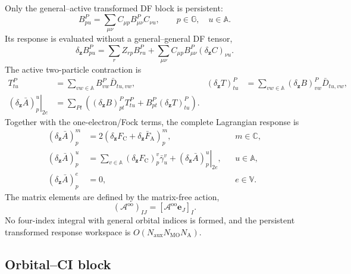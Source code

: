 \documentclass[aip,preprint,nofootinbib]{revtex4-1}
\newcommand{\core}{\mathrm{C}}
\newcommand{\act}{\mathrm{A}}
\begin{document}
Only the general--active transformed DF block is persistent:
\begin{equation}
 B^P_{pu}=\sum_{\mu\nu}C_{\mu p}B^P_{\mu\nu}C_{\nu u},
 \qquad p\in\mathbb G,\quad u\in\mathbb A.
 \label{eq:nr-general-active-df}
\end{equation}
Its response is evaluated without a general--general DF tensor,
\begin{equation}
 \delta_{\mathbf z}B^P_{pu}
 =\sum_rZ_{rp}B^P_{ru}
 +\sum_{\mu\nu}C_{\mu p}B^P_{\mu\nu}
 (\delta_{\mathbf z}C)_{\nu u}.
 \label{eq:nr-general-active-df-response}
\end{equation}
The active two-particle contraction is
\begin{align}
 T^P_{tu}&=\sum_{vw\in\mathbb A}B^P_{vw}\bar D_{tu,vw},
 &(\delta_{\mathbf z}T)^P_{tu}
 &=\sum_{vw\in\mathbb A}(\delta_{\mathbf z}B)^P_{vw}\bar D_{tu,vw},
 \label{eq:nr-df-working-rdm}
 \\
 \left.(\delta_{\mathbf z}\bar A)^{u}_{p}\right|_{2e}
 &=\sum_{Pt}\left((\delta_{\mathbf z}B)^P_{pt}T^P_{tu}
                  +B^P_{pt}(\delta_{\mathbf z}T)^P_{tu}\right).
 \label{eq:nr-df-lagrangian-response}
\end{align}
Together with the one-electron/Fock terms, the complete Lagrangian response is
\begin{align}
 (\delta_{\mathbf z}\bar A)^{m}_{p}
 &=2(\delta_{\mathbf z}F_{\core}
     +\delta_{\mathbf z}\bar F_{\act})^{m}_{p},
 &&m\in\mathbb C,
 \\
 (\delta_{\mathbf z}\bar A)^{u}_{p}
 &=\sum_{v\in\mathbb A}(\delta_{\mathbf z}F_{\core})^{v}_{p}
   \bar\gamma^{v}_{u}
  +\left.(\delta_{\mathbf z}\bar A)^{u}_{p}\right|_{2e},
 &&u\in\mathbb A,
 \label{eq:nr-lagrangian-response}
 \\
 (\delta_{\mathbf z}\bar A)^{e}_{p}&=0,
 &&e\in\mathbb V.
\end{align}
The matrix elements are defined by the matrix-free action,
\begin{equation}
 (\mathcal A^{\mathrm{oo}})_{IJ}
 =[\mathcal A^{\mathrm{oo}}\mathbf e_J]_I.
 \label{eq:nr-oo-dense}
\end{equation}
No four-index integral with general orbital indices is formed, and the
persistent transformed response workspace is
$O(N_{\mathrm{aux}}N_{\mathrm{MO}}N_{\mathrm A})$.

\subsection{Orbital--CI block}
\end{document}
